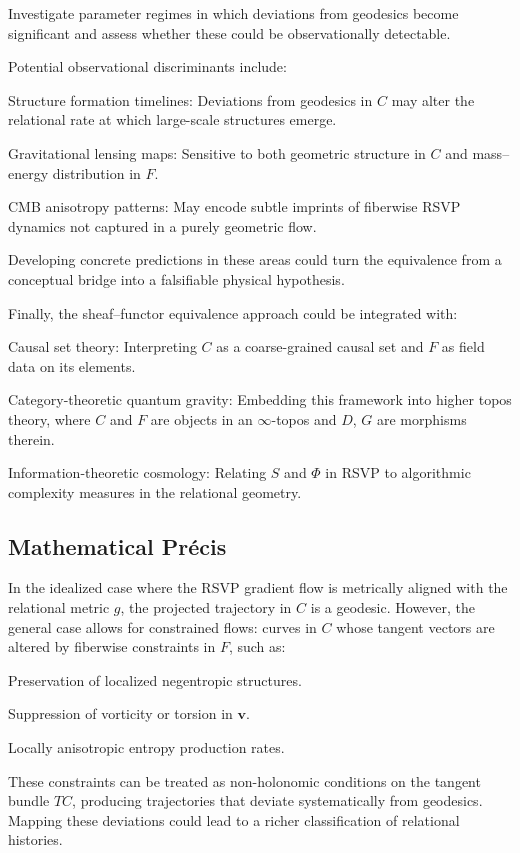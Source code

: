 \documentclass[11pt]{article}
\theoremstyle{plain}
\theoremstyle{definition}
\begin{document}
Investigate parameter regimes in which deviations from geodesics become significant and assess whether these could be observationally detectable.

Potential observational discriminants include:

Structure formation timelines: Deviations from geodesics in $C$ may alter the relational rate at which large-scale structures emerge.

Gravitational lensing maps: Sensitive to both geometric structure in $C$ and mass–energy distribution in $F$.

CMB anisotropy patterns: May encode subtle imprints of fiberwise RSVP dynamics not captured in a purely geometric flow.

Developing concrete predictions in these areas could turn the equivalence from a conceptual bridge into a falsifiable physical hypothesis.

Finally, the sheaf–functor equivalence approach could be integrated with:

Causal set theory: Interpreting $C$ as a coarse-grained causal set and $F$ as field data on its elements.

Category-theoretic quantum gravity: Embedding this framework into higher topos theory, where $C$ and $F$ are objects in an $\infty$-topos and $D$, $G$ are morphisms therein.

Information-theoretic cosmology: Relating $S$ and $\Phi$ in RSVP to algorithmic complexity measures in the relational geometry.

\subsection{Mathematical Précis}
In the idealized case where the RSVP gradient flow is metrically aligned with the relational metric $g$, the projected trajectory in $C$ is a geodesic. However, the general case allows for constrained flows: curves in $C$ whose tangent vectors are altered by fiberwise constraints in $F$, such as:

Preservation of localized negentropic structures.

Suppression of vorticity or torsion in $\mathbf{v}$.

Locally anisotropic entropy production rates.

These constraints can be treated as non-holonomic conditions on the tangent bundle $TC$, producing trajectories that deviate systematically from geodesics. Mapping these deviations could lead to a richer classification of relational histories.
\end{document}

